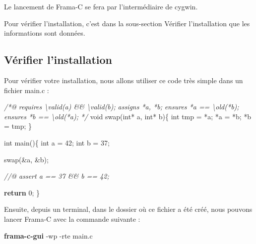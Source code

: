 \documentclass[12pt,francais,]{scrbook}
\newenvironment{Shaded}{}{}
\newcommand{\KeywordTok}[1]{\textcolor[rgb]{0.00,0.44,0.13}{\textbf{{#1}}}}
\newcommand{\DataTypeTok}[1]{\textcolor[rgb]{0.56,0.13,0.00}{{#1}}}
\newcommand{\DecValTok}[1]{\textcolor[rgb]{0.25,0.63,0.44}{{#1}}}
\newcommand{\CommentTok}[1]{\textcolor[rgb]{0.38,0.63,0.69}{\textit{{#1}}}}
\newcommand{\NormalTok}[1]{{#1}}
\begin{document}
Le lancement de Frama-C se fera par l'intermédiaire de cygwin.

Pour vérifier l'installation, c'est dans la sous-section \og{}Vérifier
l'installation\fg{} que les informations sont données.

\subsection{Vérifier l'installation}\label{vuxe9rifier-linstallation}

Pour vérifier votre installation, nous allons utiliser ce code très
simple dans un fichier \og{}main.c\fg{} :

\begin{footnotesize}\begin{Shaded}
\begin{Highlighting}[]
\CommentTok{/*@}
\CommentTok{  requires \textbackslash{}valid(a) && \textbackslash{}valid(b);}
\CommentTok{  assigns *a, *b;}
\CommentTok{  ensures *a == \textbackslash{}old(*b);}
\CommentTok{  ensures *b == \textbackslash{}old(*a);}
\CommentTok{*/}
\DataTypeTok{void} \NormalTok{swap(}\DataTypeTok{int}\NormalTok{* a, }\DataTypeTok{int}\NormalTok{* b)\{}
  \DataTypeTok{int} \NormalTok{tmp = *a;}
  \NormalTok{*a = *b;}
  \NormalTok{*b = tmp;}
\NormalTok{\}}

\DataTypeTok{int} \NormalTok{main()\{}
  \DataTypeTok{int} \NormalTok{a = }\DecValTok{42}\NormalTok{;}
  \DataTypeTok{int} \NormalTok{b = }\DecValTok{37}\NormalTok{;}

  \NormalTok{swap(&a, &b);}

  \CommentTok{//@ assert a == 37 && b == 42;}

  \KeywordTok{return} \DecValTok{0}\NormalTok{;}
\NormalTok{\}}
\end{Highlighting}
\end{Shaded}\end{footnotesize}

Ensuite, depuis un terminal, dans le dossier où ce fichier a été créé,
nous pouvons lancer Frama-C avec la commande suivante :

\begin{footnotesize}\begin{Shaded}
\begin{Highlighting}[]
\KeywordTok{frama-c-gui} \NormalTok{-wp -rte main.c}
\end{Highlighting}
\end{Shaded}\end{footnotesize}
\end{document}
